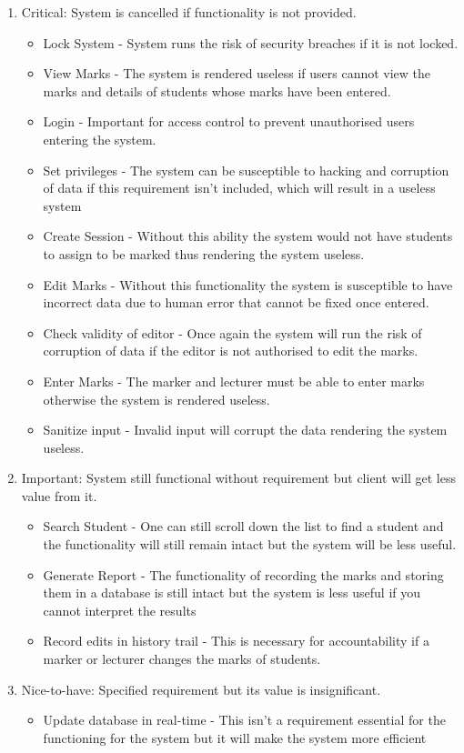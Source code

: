 \documentclass[a4paper]{article}
\begin{document}
			\begin{enumerate}
			\item Critical: System is cancelled if functionality is not provided.
			\begin{itemize}
			\item{Lock System - System runs the risk of security breaches if it is not locked.}
			\item{View Marks - The system is rendered useless if users cannot view the marks and details of students whose marks have been entered.}
			\item{Login - Important for access control to prevent unauthorised users entering the system.}
			\item {Set privileges - The system can be susceptible to hacking and corruption of data if this requirement isn't included, which will result in a useless system}
			\item {Create Session - Without this ability the system would not have students to assign to be marked thus rendering the system useless.}
			\item {Edit Marks - Without this functionality the system is susceptible to have incorrect data due to human error that cannot be fixed once entered.}
			\item {Check validity of editor - Once again the system will run the risk of corruption of data if the editor is not authorised to edit the marks.}
			\item {Enter Marks - The marker and lecturer must be able to enter marks otherwise the system is rendered useless.}
			\item {Sanitize input - Invalid input will corrupt the data rendering the system useless.}
			\end{itemize}
			\item Important: System still functional without requirement but client will get less value from it.
			\begin{itemize}
			\item {Search Student - One can still scroll down the list to find a student and the functionality will still remain intact but the system will be less useful.}
			\item { Generate Report - The functionality of recording the marks and storing them in a database is still intact but the system is less useful if you cannot interpret the results}
			\item { Record edits in history trail - This is necessary for accountability if a marker or lecturer changes the marks of students.}
			\end{itemize}
			\item Nice-to-have: Specified requirement but its value is insignificant.
			\begin{itemize}
				\item{Update database in real-time - This isn't a requirement essential for the functioning for the system but it will make the system more efficient}		
			\end{itemize}
			\end{enumerate}
\end{document}
